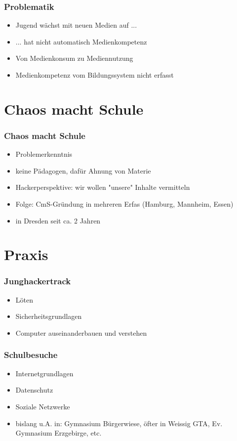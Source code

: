 \documentclass[12pt]{beamer}
\begin{document}
\begin{frame}
  \frametitle{Problematik}
  \begin{itemize}
    \item Jugend wächst mit neuen Medien auf ...
    \item ... hat nicht automatisch Medienkompetenz
    \item Von Medienkonsum zu Mediennutzung
    \item Medienkompetenz vom Bildungssystem nicht erfasst
  \end{itemize}
\end{frame}

\section{Chaos macht Schule}

\begin{frame}
  \frametitle{Chaos macht Schule}
  \begin{itemize}
    \item Problemerkenntnis
    \item keine Pädagogen, dafür Ahnung von Materie
    \item Hackerperspektive: wir wollen "unsere" Inhalte vermitteln
    \item Folge: CmS-Gründung in mehreren Erfas (Hamburg, Mannheim, Essen)
    \item in Dresden seit ca. 2 Jahren
  \end{itemize}
\end{frame}

\section{Praxis}

\begin{frame}
  \frametitle{Junghackertrack}
  \begin{itemize}
    \item Löten
    \item Sicherheitsgrundlagen
    \item Computer auseinanderbauen und verstehen
  \end{itemize}
\end{frame}

\begin{frame}
  \frametitle{Schulbesuche}
  \begin{itemize}
    \item Internetgrundlagen
    \item Datenschutz
    \item Soziale Netzwerke
    \item bislang u.A. in: Gymnasium Bürgerwiese, öfter in Weissig GTA, Ev. Gymnasium Erzgebirge, etc.
  \end{itemize}
\end{frame}
\end{document}
